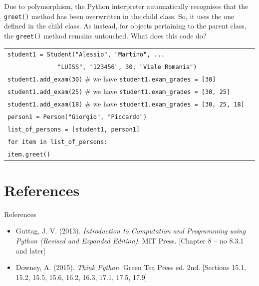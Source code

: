 \documentclass[t,handout,9pt]{beamer}
\begin{document}
\begin{frame}
\vfill
Due to polymorphism, the Python interpreter automatically recognises that the \texttt{greet()} method has been overwritten in the child class. So, it uses the one defined in the child class.
\vfill
As instead, for objects pertaining to the parent class, the \texttt{greet()} method remains untouched.
\vfill
What does this code do?
\vspace{-2mm}
\begin{table}[]
\begin{flushleft}
\begin{tabular}{ll}
\texttt{student1 = Student("Alessio", "Martino", ... } &  \\
\texttt{\ \ \ \ \ \ \ \ \ \ \ \ \ \ "LUISS", "123456", 30, "Viale Romania")} &  \\
\texttt{student1.add\_exam(30)} \qquad \# we have \texttt{student1.exam\_grades = [30]} &  \\
\texttt{student1.add\_exam(25)} \qquad \# we have \texttt{student1.exam\_grades = [30, 25]} &  \\
\texttt{student1.add\_exam(18)} \qquad \# we have \texttt{student1.exam\_grades = [30, 25, 18]} &  \\
\texttt{person1 = Person("Giorgio", "Piccardo")} &  \\
\texttt{list\_of\_persons = [student1, person1]} &  \\
\texttt{for item in list\_of\_persons:} &  \\
\texttt{\qquad item.greet()} &  \\
\end{tabular}
\end{flushleft}
\end{table}
\vfill
\end{frame}
\section{References}
\begin{frame}{References}
\begin{itemize}
	\item Guttag, J. V. (2013). \textit{Introduction to Computation and Programming using Python (Revised and Expanded Edition)}. MIT Press. [Chapter 8 -- no 8.3.1 and later]
	\item Downey, A. (2015). \textit{Think Python}. Green Tea Press ed. 2nd. [Sections 15.1, 15.2, 15.5, 15.6, 16.2, 16.3, 17.1, 17.5, 17.9]
\end{itemize}
\end{frame}
\end{document}
